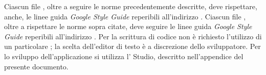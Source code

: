 		Ciascun file , oltre a seguire le norme precedentemente descritte, deve rispettare, anche, le linee guida \textit{Google  Style Guide} reperibili all'indirizzo . 
		Ciascun file , oltre a rispettare le norme sopra citate, deve seguire le linee guida \textit{Google  Style Guide} reperibili all'indirizzo . 
	Per la scrittura di codice  non è richiesto l'utilizzo di un particolare ; la scelta dell'editor di testo è a discrezione dello sviluppatore.
		Per lo sviluppo dell'applicazione  si utilizza l'  Studio, descritto nell'appendice  del presente documento.
